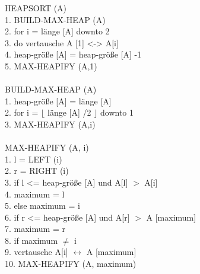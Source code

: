 \documentclass[fs, footer]{latex4ei}
\begin{document}
\begin{multicols*}{4}
{{\begin{multicols}{2}
HEAPSORT (A)\\
1.  BUILD-MAX-HEAP (A)\\
2.  for i = länge [A] downto 2\\
3. 	do vertausche A [1] <-> A[i]\\
4. 	heap-größe [A] = heap-größe [A] -1\\
5.	MAX-HEAPIFY (A,1)\\
\\
BUILD-MAX-HEAP (A)\\
1.  heap-größe [A] = länge [A]\\
2.  for i = $\lfloor$ länge [A] /2 $\rfloor$ downto 1\\
3.  \quad MAX-HEAPIFY (A,i)\\
\columnbreak \\
MAX-HEAPIFY (A, i)\\
1.  l = LEFT (i)\\
2.  r = RIGHT (i)\\
3.  if l <= heap-größe [A] und A[l] $>$ A[i]\\
4. 	\quad maximum = l\\
5. 	else maximum = i\\
6.  if r <= heap-größe [A] und A[r] $>$ A [maximum]\\
7.  \quad maximum = r\\
8.  if maximum $\neq$ i\\
9.  \quad vertausche A[i] $\leftrightarrow$ A [maximum]\\
10. \qquad MAX-HEAPIFY (A, maximum)\\

\end{multicols}
\fi

}}
\end{multicols*}
\end{document}

